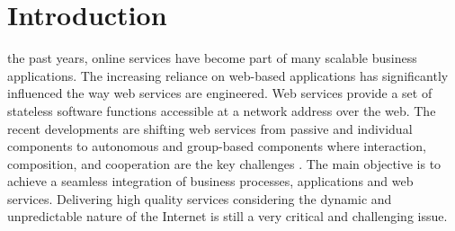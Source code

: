 \documentclass[10pt,journal,cspaper,compsoc]{IEEEtran}
\begin{document}
\maketitle


\IEEEdisplaynotcompsoctitleabstractindextext


%
\IEEEpeerreviewmaketitle



\section{Introduction}\label{s:introduction}

 the past years, online services have become
part of many scalable business applications. The increasing
reliance on web-based applications has significantly influenced
the way web services are engineered. Web services provide a set of
stateless software functions accessible at a network address over
the web. The recent developments are shifting web services from
passive and individual components to autonomous and group-based
components where interaction, composition, and cooperation are the
key challenges \cite{ICWS2011-1,SCC2011-1,Baldoni2010,Younas2013}.
The main objective is to achieve a seamless integration of
business processes, applications and web services. Delivering high
quality services considering the dynamic and unpredictable nature
of the Internet is still a very critical and challenging issue.
\end{document}
